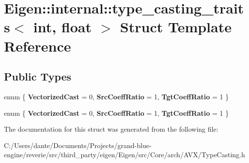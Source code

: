\hypertarget{struct_eigen_1_1internal_1_1type__casting__traits_3_01int_00_01float_01_4}{}\section{Eigen\+::internal\+::type\+\_\+casting\+\_\+traits$<$ int, float $>$ Struct Template Reference}
\label{struct_eigen_1_1internal_1_1type__casting__traits_3_01int_00_01float_01_4}
\subsection*{Public Types}
\begin{DoxyCompactItemize}
\item 
\mbox{\label{struct_eigen_1_1internal_1_1type__casting__traits_3_01int_00_01float_01_4_a59dd35f961bafa193c294049884a8194}} 
enum \{ {\bfseries Vectorized\+Cast} = 0, 
{\bfseries Src\+Coeff\+Ratio} = 1, 
{\bfseries Tgt\+Coeff\+Ratio} = 1
 \}
\item 
\mbox{\label{struct_eigen_1_1internal_1_1type__casting__traits_3_01int_00_01float_01_4_a105867604cf2ba63a9e2e06cd80b144b}} 
enum \{ {\bfseries Vectorized\+Cast} = 0, 
{\bfseries Src\+Coeff\+Ratio} = 1, 
{\bfseries Tgt\+Coeff\+Ratio} = 1
 \}
\end{DoxyCompactItemize}


The documentation for this struct was generated from the following file\+:\begin{DoxyCompactItemize}
\item 
C\+:/\+Users/dante/\+Documents/\+Projects/grand-\/blue-\/engine/reverie/src/third\+\_\+party/eigen/\+Eigen/src/\+Core/arch/\+A\+V\+X/Type\+Casting.\+h\end{DoxyCompactItemize}
